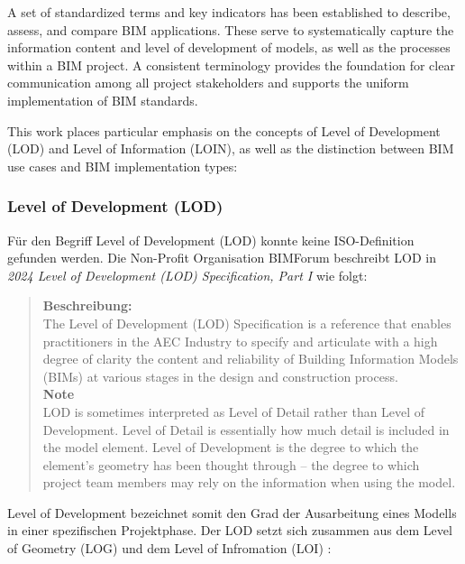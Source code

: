 \begin{English}
    A set of standardized terms and key indicators has been established to describe, assess, and compare BIM applications. These serve to systematically capture the information content and level of development of models, as well as the processes within a BIM project. A consistent terminology provides the foundation for clear communication among all project stakeholders and supports the uniform implementation of BIM standards. 
    
    This work places particular emphasis on the concepts of Level of Development (LOD) and Level of Information (LOIN), as well as the distinction between BIM use cases and BIM implementation types:
\end{English}

\setlength{\parindent}{0pt}
\subsubsection{Level of Development (LOD)}

\begin{German}
    Für den Begriff Level of Development (LOD) konnte keine ISO-Definition gefunden werden. Die Non-Profit Organisation BIMForum beschreibt LOD in \textit{2024 Level of Development (LOD) Specification, Part I} wie folgt:

    \begin{quote}
        \textbf{Beschreibung:}\\
        The Level of Development (LOD) Specification is a reference that enables practitioners in the AEC Industry to specify and articulate with a high degree of clarity the content and reliability of Building Information Models (BIMs) at various stages in the design and construction process.\\
        
        \textbf{Note}\\
        LOD is sometimes interpreted as Level of Detail rather than Level of Development. Level of Detail is essentially how much detail is included in the model element. Level of Development is the degree to which the element's geometry has been thought through -- the degree to which project team members may rely on the information when using the model.
    \end{quote}
    
    Level of Development bezeichnet somit den Grad der Ausarbeitung eines Modells in einer spezifischen Projektphase. Der LOD setzt sich zusammen aus dem Level of Geometry (LOG) und dem Level of Infromation (LOI) \cite{astourLehrbuchGrundlagenBIMArbeitsmethode2022}:
\end{German}

